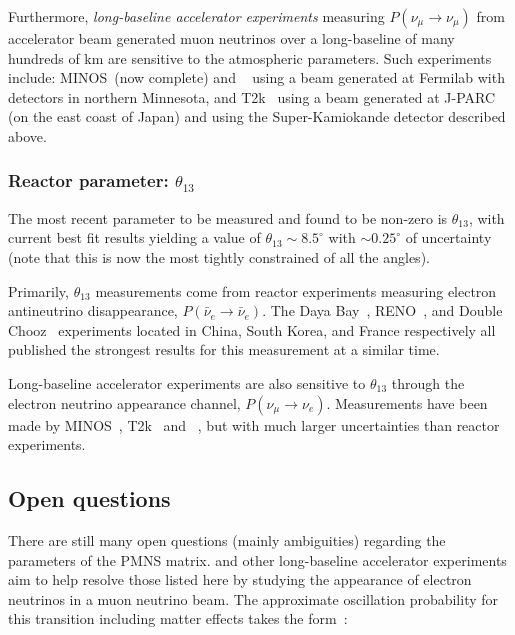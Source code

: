 Furthermore, \emph{long-baseline accelerator experiments} measuring
$P(\nu_{\mu}\rightarrow\nu_{\mu})$ from accelerator beam generated muon neutrinos over a
long-baseline of many hundreds of km are sensitive to the atmospheric parameters. Such experiments
include: MINOS~\cite{adamson2013_1, adamson2013_2}(now complete) and \nova~\cite{acero2019,
    himmel2020} using a beam generated at Fermilab with detectors in northern Minnesota, and
T2k~\cite{dunne2020} using a beam generated at J-PARC (on the east coast of Japan) and using the
Super-Kamiokande detector described above.

\subsubsection*{Reactor parameter: $\theta_{13}$} %

The most recent parameter to be measured and found to be non-zero is $\theta_{13}$, with current
best fit results yielding a value of $\theta_{13}\sim8.5^{\circ}$ with $\sim0.25^{\circ}$ of
uncertainty (note that this is now the most tightly constrained of all the angles).

Primarily, $\theta_{13}$ measurements come from reactor experiments measuring electron
antineutrino disappearance, $P(\bar{\nu}_{e}\rightarrow\bar{\nu}_{e})$. The Daya Bay~\cite{an2012,
    an2017}, RENO~\cite{ahn2012, bak2018}, and Double Chooz~\cite{abe2012} experiments located in
China, South Korea, and France respectively all published the strongest results for this
measurement at a similar time.

Long-baseline accelerator experiments are also sensitive to $\theta_{13}$ through the electron
neutrino appearance channel, $P(\nu_{\mu}\rightarrow\nu_{e})$. Measurements have been made by
MINOS~\cite{adamson2013_2}, T2k~\cite{abe2013} and \nova~\cite{adamson2016_2}, but with much
larger uncertainties than reactor experiments.

\subsection{Open questions} %
\label{sec:theory_status_open} %

There are still many open questions (mainly ambiguities) regarding the parameters of the PMNS
matrix. \chips and other long-baseline accelerator experiments aim to help resolve those listed
here by studying the appearance of electron neutrinos in a muon neutrino beam. The approximate
oscillation probability for this transition including matter effects takes the
form~\cite{particle2020}:

